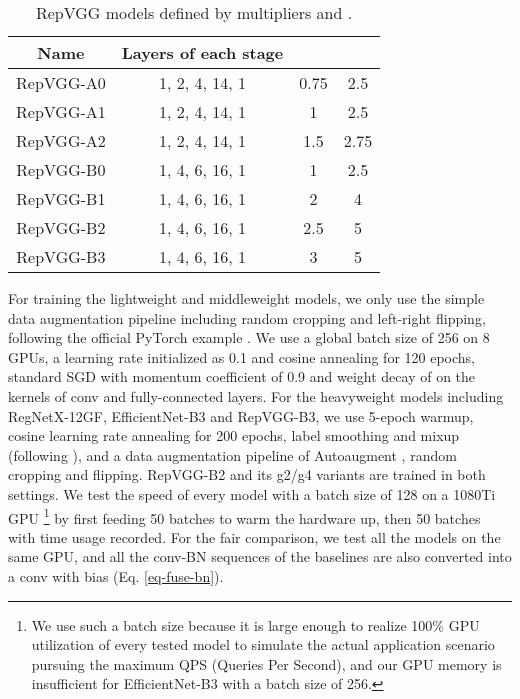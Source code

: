 \documentclass[final]{cvpr}
\begin{document}
\setlength{\tabcolsep}{4pt}
\begin{table}
	\caption{RepVGG models defined by multipliers  and .}
	\label{table-model-summary}
	\vspace{-0.2in}
	\begin{center}
		\small
		\begin{tabular}{c|c|c|c}
			\hline
			Name			&	Layers of each stage	&	  		&			\\
			\hline
			RepVGG-A0		&	1, 2, 4, 14, 1			&	0.75			&	2.5		\\
			RepVGG-A1		&	1, 2, 4, 14, 1			&	1			&	2.5		\\
			RepVGG-A2		&	1, 2, 4, 14, 1			&	1.5			&	2.75		\\
			\hline
			RepVGG-B0		&	1, 4, 6, 16, 1			&	1			&	2.5		\\
			RepVGG-B1		&	1, 4, 6, 16, 1			&	2			&	4		\\
			RepVGG-B2		&	1, 4, 6, 16, 1			&	2.5			&	5		\\
			RepVGG-B3		&	1, 4, 6, 16, 1			&	3			&	5	\\
			\hline
		\end{tabular}
	\end{center}
	\vspace{-0.3in}
\end{table}
\setlength{\tabcolsep}{1.4pt}

For training the lightweight and middleweight models, we only use the simple data augmentation pipeline including random cropping and left-right flipping, following the official PyTorch example \cite{pytorch-example}. We use a global batch size of 256 on 8 GPUs, a learning rate initialized as 0.1 and cosine annealing for 120 epochs, standard SGD with momentum coefficient of 0.9 and weight decay of  on the kernels of conv and fully-connected layers. For the heavyweight models including RegNetX-12GF, EfficientNet-B3 and RepVGG-B3, we use 5-epoch warmup, cosine learning rate annealing for 200 epochs, label smoothing \cite{szegedy2016rethinking} and mixup \cite{zhang2017mixup} (following \cite{he2019bag}), and a data augmentation pipeline of Autoaugment \cite{cubuk2019autoaugment}, random cropping and flipping. RepVGG-B2 and its g2/g4 variants are trained in both settings. We test the speed of every model with a batch size of 128 on a 1080Ti GPU \footnote{We use such a batch size because it is large enough to realize 100\% GPU utilization of every tested model to simulate the actual application scenario pursuing the maximum QPS (Queries Per Second), and our GPU memory is insufficient for EfficientNet-B3 with a batch size of 256.} by first feeding 50 batches to warm the hardware up, then 50 batches with time usage recorded. For the fair comparison, we test all the models on the same GPU, and all the conv-BN sequences of the baselines are also converted into a conv with bias (Eq. \ref{eq-fuse-bn}). 
\end{document}

